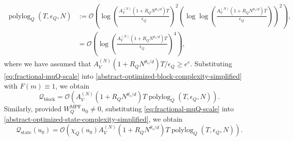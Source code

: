 \documentclass[10pt,reqno]{article}
\numberwithin{equation}{section}
\theoremstyle{plain}
\theoremstyle{definition}
\begin{document}
\begin{align}\label{eq:fractional-polylog-factor}
\operatorname{polylog}_Q(T,\epsilon_Q,N) &:= \mathcal{O} \left( \log\left(\frac{ A_V^{(N)} (1+R_QN^{\theta_s/d}) T}{\epsilon_Q}\right)^2 \left( \log\log\left(\frac{ A_V^{(N)} (1+R_QN^{\theta_s/d}) T}{\epsilon_Q}\right) \right)^2\right), \\ &= \mathcal{O} \left( \log\left(\frac{ A_V^{(N)} (1+R_QN^{\theta_s/d}) T}{\epsilon_Q}\right)^4\right),
\end{align}
where we have assumed that $A_V^{(N)} (1+R_QN^{\theta_s/d}) T/\epsilon_Q \geq e^e$.  Substituting \cref{eq:fractional-muQ-scale} into \cref{abstract-optimized-block-complexity-simplified} with \(F(m)\equiv1\), we obtain
\begin{equation}
\mathcal Q_{\operatorname{block}} = \mathcal O ( A_V^{(N)} (1+R_QN^{\theta_s/d} )T \operatorname{polylog}_Q(T,\epsilon_Q,N) ).
\end{equation}
Similarly, provided \(W_Q^{\operatorname{MPF}}u_0\neq0\), substituting \cref{eq:fractional-muQ-scale} into \cref{abstract-optimized-state-complexity-simplified}, we obtain
\begin{equation}\label{eq:fractional-state-complexity-final}
\mathcal Q_{\operatorname{state}}(u_0) = \mathcal O ( \chi_Q(u_0) A_V^{(N)} (1+R_QN^{\theta_s/d} )T \operatorname{polylog}_Q(T,\epsilon_Q,N) ).
\end{equation}
\end{document}
